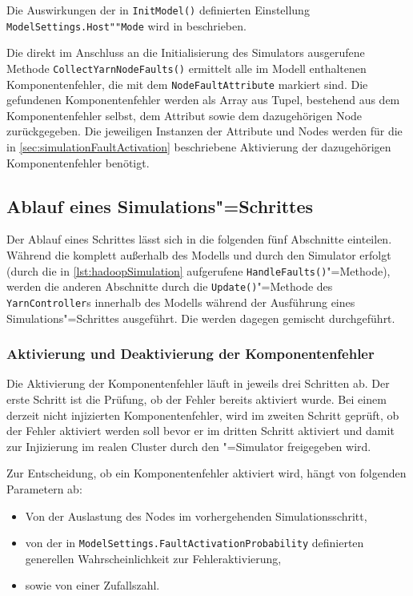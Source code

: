 Die Auswirkungen der in \texttt{InitModel()} definierten Einstellung \texttt{ModelSettings.Host""Mode} wird in  beschrieben.

Die direkt im Anschluss an die Initialisierung des Simulators ausgerufene Methode \texttt{CollectYarnNodeFaults()} ermittelt alle im Modell enthaltenen Komponentenfehler, die mit dem \texttt{NodeFaultAttribute} markiert sind.
Die gefundenen Komponentenfehler werden als Array aus Tupel, bestehend aus dem Komponentenfehler selbst, dem Attribut sowie dem dazugehörigen Node zurückgegeben.
Die jeweiligen Instanzen der Attribute und Nodes werden für die in \autoref{sec:simulationFaultActivation} beschriebene Aktivierung der dazugehörigen Komponentenfehler benötigt.

\subsection{Ablauf eines Simulations"=Schrittes}
\label{sec:simulationStep}

Der Ablauf eines Schrittes lässt sich in die folgenden fünf Abschnitte einteilen.
Während die  komplett außerhalb des Modells und durch den Simulator erfolgt (durch die in \autoref{lst:hadoopSimulation} aufgerufene \texttt{HandleFaults()}"=Methode), werden die anderen Abschnitte durch die \texttt{Update()}"=Methode des \texttt{YarnController}s innerhalb des Modells während der Ausführung eines Simulations"=Schrittes ausgeführt.
Die  werden dagegen gemischt durchgeführt.

\subsubsection{Aktivierung und Deaktivierung der Komponentenfehler}
\label{sec:simulationFaultActivation}

Die Aktivierung der Komponentenfehler läuft in jeweils drei Schritten ab.
Der erste Schritt ist die Prüfung, ob der Fehler bereits aktiviert wurde.
Bei einem derzeit nicht injizierten Komponentenfehler, wird im zweiten Schritt geprüft, ob der Fehler aktiviert werden soll bevor er im dritten Schritt aktiviert und damit zur Injizierung im realen Cluster durch den \sS"=Simulator freigegeben wird.

Zur Entscheidung, ob ein Komponentenfehler aktiviert wird, hängt von folgenden Parametern ab:

\begin{itemize}
    \item Von der Auslastung des Nodes im vorhergehenden Simulationsschritt,
    \item von der in \texttt{ModelSettings.FaultActivationProbability} definierten generellen Wahrscheinlichkeit zur Fehleraktivierung,
    \item sowie von einer Zufallszahl.
\end{itemize}

